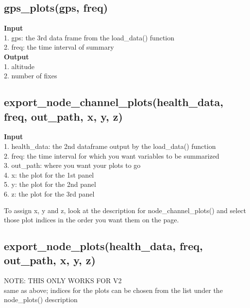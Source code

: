 \documentclass[
]{book}
\begin{document}
\hypertarget{gps_plotsgps-freq}{%
\subsection{gps\_plots(gps, freq)}\label{gps_plotsgps-freq}}

\textbf{Input}\\
1. gps: the 3rd data frame from the load\_data() function\\
2. freq: the time interval of summary\\
\textbf{Output}\\
1. altitude\\
2. number of fixes

\hypertarget{export_node_channel_plotshealth_data-freq-out_path-x-y-z}{%
\subsection{export\_node\_channel\_plots(health\_data, freq, out\_path, x, y, z)}\label{export_node_channel_plotshealth_data-freq-out_path-x-y-z}}

\textbf{Input}\\
1. health\_data: the 2nd dataframe output by the load\_data() function\\
2. freq: the time interval for which you want variables to be summarized\\
3. out\_path: where you want your plots to go\\
4. x: the plot for the 1st panel\\
5. y: the plot for the 2nd panel\\
6. z: the plot for the 3rd panel

To assign x, y and z, look at the description for node\_channel\_plots() and select those plot indices in the order you want them on the page.

\hypertarget{export_node_plotshealth_data-freq-out_path-x-y-z}{%
\subsection{export\_node\_plots(health\_data, freq, out\_path, x, y, z)}\label{export_node_plotshealth_data-freq-out_path-x-y-z}}

NOTE: THIS ONLY WORKS FOR V2\\
same as above; indices for the plots can be chosen from the list under the node\_plots() description
\end{document}
